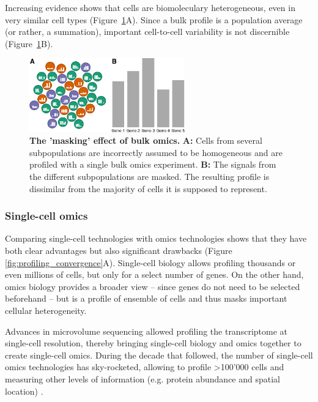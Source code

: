 Increasing evidence shows that cells are biomoleculary heterogeneous, even in very similar cell types \cite{hwang_singlecellrnasequencing_2018} (Figure~\ref{fig:bulk_vs_sc}A). Since a bulk profile is a population average (or rather, a summation), important cell-to-cell variability is not discernible (Figure~\ref{fig:bulk_vs_sc}B). 

\begin{figure}[htb!]
	\centering
	\includegraphics[width=0.6\textwidth]{fig/bulk_vs_sc} 
	\caption{
		\textbf{The 'masking' effect of bulk omics.} 
		\textbf{A:} Cells from several subpopulations are incorrectly assumed to be homogeneous and are profiled with a single bulk omics experiment.
		\textbf{B:} The signals from the different subpopulations are masked. The resulting profile is dissimilar from the majority of cells it is supposed to represent.
	}
	\label{fig:bulk_vs_sc}
\end{figure}

\subsubsection{Single-cell omics}
Comparing single-cell technologies with omics technologies shows that they have both clear advantages but also significant drawbacks (Figure \ref{fig:profiling_convergence}A). Single-cell biology allows profiling thousands or even millions of cells, but only for a select number of genes. On the other hand, omics biology provides a broader view -- since genes do not need to be selected beforehand -- but is a profile of ensemble of cells and thus masks important cellular heterogeneity.

Advances in microvolume sequencing allowed profiling the transcriptome at single-cell resolution, thereby bringing single-cell biology and omics together to create single-cell omics. During the decade that followed, the number of single-cell omics technologies has sky-rocketed, allowing to profile >100'000 cells \cite{svensson_exponentialscalingsinglecell_2018} and measuring other levels of information (e.g. protein abundance and spatial location) \cite{moudgil_multimodalscrnaseq_2019}. 

